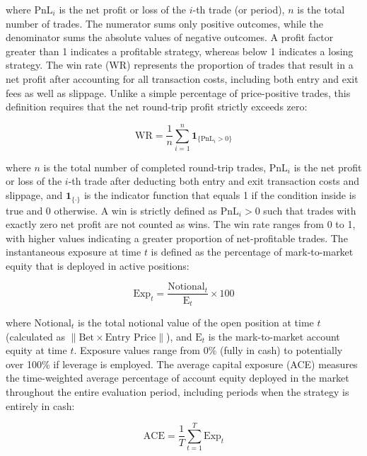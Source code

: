 \documentclass[12pt, a4paper]{article}
\begin{document}
where \(\text{PnL}_i\) is the net profit or loss of the \(i\)-th trade (or period), \(n\) is the total number of trades. The numerator sums only positive outcomes, 
while the denominator sums the absolute values of negative outcomes. A profit factor greater than 1 indicates a profitable strategy, whereas below 1 indicates a losing strategy.
The win rate (WR) represents the proportion of trades that result in a net profit after accounting for all transaction costs, including both entry and exit fees as well as slippage. 
Unlike a simple percentage of price-positive trades, this definition requires that the net round-trip profit strictly exceeds zero:

\begin{equation}
    \text{WR} = \frac{1}{n} \sum_{i=1}^{n} \mathbf{1}_{\{\text{PnL}_i > 0\}}
    \label{eq:win_rate}
\end{equation}

where \(n\) is the total number of completed round-trip trades, \(\text{PnL}_i\) is the net profit or loss of the \(i\)-th trade after deducting both entry and exit transaction costs and 
slippage, and \(\mathbf{1}_{\{\cdot\}}\) is the indicator function that equals 1 if the condition inside is true and 0 otherwise. 
A win is strictly defined as \(\text{PnL}_i > 0\) such that trades with exactly zero net profit are not counted as wins. The win rate ranges from 0 to 1, 
with higher values indicating a greater proportion of net-profitable trades.
The instantaneous exposure at time \(t\) is defined as the percentage of mark-to-market equity that is deployed in active positions:

\begin{equation}
    \text{Exp}_t = \frac{\text{Notional}_t}{\text{E}_t} \times 100
    \label{eq:exposure}
\end{equation}

where \(\text{Notional}_t\) is the total notional value of the open position at time \(t\) (calculated as $\|\text{Bet} \times \text{Entry Price}\|$), and 
\(\text{E}_t\) is the mark-to-market account equity at time \(t\). Exposure values range from 0\% (fully in cash) to potentially over 100\% if leverage is employed.
The average capital exposure (ACE) measures the time-weighted average percentage of account equity deployed in the market throughout the entire evaluation period, 
including periods when the strategy is entirely in cash:

\begin{equation}
    \text{ACE} = \frac{1}{T} \sum_{t=1}^{T} \text{Exp}_t
    \label{eq:avg_capital_exposure}
\end{equation}
\end{document}
